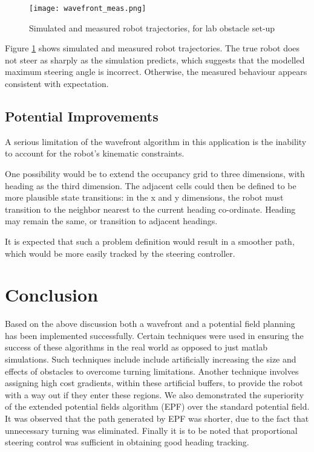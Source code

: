 \documentclass[11pt]{article} %
\begin{document}
\begin{figure} [hbt]
 \centering
 \texttt{[image: wavefront\_meas.png]}
 \caption{Simulated and measured robot trajectories, for lab obstacle set-up}
 \label{wave_meas}
\end{figure}

Figure \ref{wave_meas} shows simulated and measured robot trajectories.  The true robot does not steer as sharply as the simulation predicts, which suggests that the modelled maximum steering angle is incorrect.  Otherwise, the measured behaviour appears consistent with expectation.

\subsection{Potential Improvements}
A serious limitation of the wavefront algorithm in this application is the inability to account for the robot's kinematic constraints.  

One possibility would be to extend the occupancy grid to three dimensions, with heading as the third dimension.  The adjacent cells could then be defined to be more plausible state transitions:  in the x and y dimensions, the robot must transition to the neighbor nearest to the current heading co-ordinate.  Heading may remain the same, or transition to adjacent headings.

It is expected that such a problem definition would result in a smoother path, which would be more easily tracked by the steering controller.

\section*{Conclusion}
Based on the above discussion both a wavefront and a potential field planning
has been implemented successfully. Certain techniques were used in ensuring
the success of these algorithms in the real world as opposed to just matlab
simulations. Such techniques include include artificially increasing the size
and effects of obstacles to overcome turning limitations. Another technique
involves assigning high cost gradients, within these artificial buffers, to
provide the robot with a way out if they enter these regions. We also
demonstrated the superiority of the extended potential fields algorithm (EPF)
over the standard potential field. It was observed that the path generated by
EPF was shorter, due to the fact that unnecessary turning was eliminated.
Finally it is to be noted that proportional steering control was sufficient in
obtaining good heading tracking.
\end{document}
